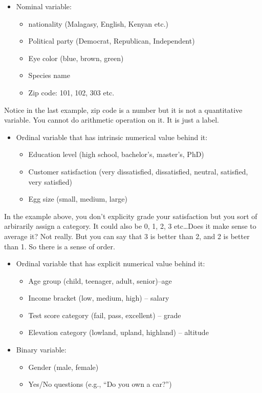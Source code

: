 \documentclass[
  letterpaper,
  DIV=11,
  numbers=noendperiod]{scrreprt}
\providecommand{\tightlist}{%
  \setlength{\itemsep}{0pt}\setlength{\parskip}{0pt}}
\begin{document}
\begin{itemize}
\tightlist
\item
  Nominal variable:

  \begin{itemize}
  \tightlist
  \item
    nationality (Malagasy, English, Kenyan etc.)
  \item
    Political party (Democrat, Republican, Independent)
  \item
    Eye color (blue, brown, green)
  \item
    Species name
  \item
    Zip code: 101, 102, 303 etc.
  \end{itemize}
\end{itemize}

Notice in the last example, zip code is a number but it is not a
quantitative variable. You cannot do arithmetic operation on it. It is
just a label.

\begin{itemize}
\tightlist
\item
  Ordinal variable that has intrinsic numerical value behind it:

  \begin{itemize}
  \tightlist
  \item
    Education level (high school, bachelor's, master's, PhD)
  \item
    Customer satisfaction (very dissatisfied, dissatisfied, neutral,
    satisfied, very satisfied)
  \item
    Egg size (small, medium, large)
  \end{itemize}
\end{itemize}

In the example above, you don't explicity grade your satisfaction but
you sort of arbirarily assign a category. It could also be 0, 1, 2, 3
etc\ldots Does it make sense to average it? Not really. But you can say
that 3 is better than 2, and 2 is better than 1. So there is a sense of
order.

\begin{itemize}
\tightlist
\item
  Ordinal variable that has explicit numerical value behind it:

  \begin{itemize}
  \tightlist
  \item
    Age group (child, teenager, adult, senior)--age
  \item
    Income bracket (low, medium, high) -- salary
  \item
    Test score category (fail, pass, excellent) -- grade
  \item
    Elevation category (lowland, upland, highland) -- altitude
  \end{itemize}
\item
  Binary variable:

  \begin{itemize}
  \tightlist
  \item
    Gender (male, female)
  \item
    Yes/No questions (e.g., ``Do you own a car?'')
  \end{itemize}
\end{itemize}
\end{document}
